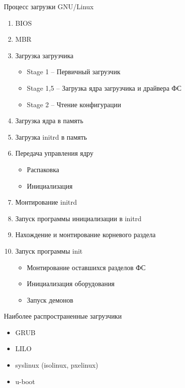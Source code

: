 \documentclass[ignorenonframetext, professionalfonts, hyperref={pdftex, unicode}]{beamer}
\begin{document}
\begin{frame}{Процесс загрузки GNU/Linux}

	\begin{enumerate}
		\item BIOS
		\item MBR
			\pause
		\item Загрузка загрузчика
		\begin{itemize}
			\item Stage 1 -- Первичный загрузчик
			\item Stage 1,5 -- Загрузка ядра загрузчика и драйвера ФС
			\item Stage 2 -- Чтение конфигурации
		\end{itemize}
			\pause

		\item Загрузка ядра в память
		\item Загрузка initrd в память
			\pause
		\item Передача управления ядру
		\begin{itemize}
			\item Распаковка
			\item Инициализация
		\end{itemize}

		\item Монтирование initrd
		\item Запуск программы инициализации в initrd
			\pause
		\item Нахождение и монтирование корневого раздела
			\pause
		\item Запуск программы init
		\begin{itemize}
			\item Монтирование оставшихся разделов ФС
			\item Инициализация оборудования
			\item Запуск демонов
		\end{itemize}

	\end{enumerate}
\end{frame}


\begin{frame}{Наиболее распространенные загрузчики}
	\begin{itemize}
		\item GRUB
		\item LILO
		\item syslinux (isolinux, pxelinux)
		\item u-boot
	\end{itemize}
\end{frame}
\end{document}
